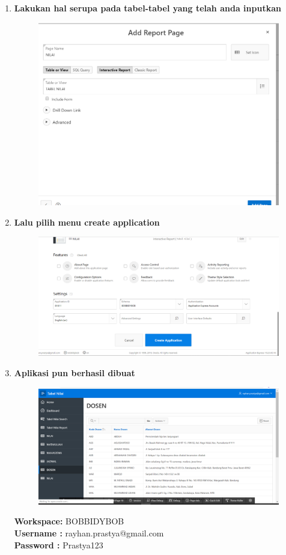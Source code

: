\begin{enumerate}
\item \textbf{Lakukan hal serupa pada tabel-tabel yang telah anda inputkan}
\begin{figure}[H]
    \centering
    \includegraphics[scale=0.3]{figures/20.png}
    \label{18}
\end{figure}


\item \textbf{Lalu pilih menu create application}\begin{figure}[H]
    \centering
    \includegraphics[scale=0.3]{figures/21.png}
    \label{19}
\end{figure}

\item \textbf{Aplikasi pun berhasil dibuat}
\begin{figure}[H]
    \centering
    \includegraphics[scale=0.3]{figures/22.png}
    \label{28}
\end{figure}

\textbf{Workspace:} BOBBIDYBOB \\
\textbf{Username :} rayhan.prastya@gmail.com \\
\textbf{Password :} Prastya123

\end{enumerate}